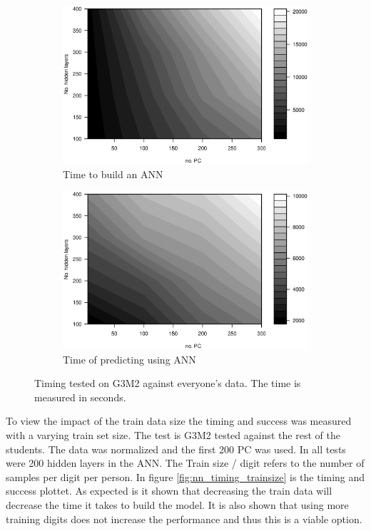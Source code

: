 \begin{figure}[h]
    \begin{subfigure}{0.49\textwidth}
    \centering
        \includegraphics[width=\textwidth]{graphics/contour_nn_size_vs_pca_model}
        \caption{Time to build an ANN}
        \label{fig:contour_nn_size_vs_pca_time_model}
    \end{subfigure}
    \begin{subfigure}{0.49\textwidth}
        \includegraphics[width=\textwidth]{graphics/contour_nn_size_vs_pca_predict}
        \caption{Time of predicting using ANN}
        \label{fig:contour_nn_size_vs_pca_time_predict}
    \end{subfigure}
    \caption{Timing tested on G3M2 against everyone's data. The time is measured in seconds.}
    \label{fig:contour_nn_both}
\end{figure}

To view the impact of the train data size the timing and success was measured with a varying train set size.
The test is G3M2 tested against the rest of the students.
The data was normalized and the first 200 PC was used.
In all tests were 200 hidden layers in the ANN.
The Train size / digit refers to the number of samples per digit per person.
In figure \ref{fig:nn_timing_trainsize} is the timing and success plottet.
As expected is it shown that decreasing the train data will decrease the time it takes to build the model.
It is also shown that using more training digits does not increase the performance and thus this is a viable option.

